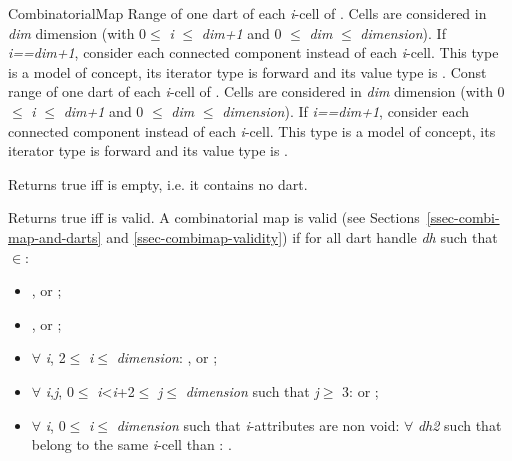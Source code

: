 \begin{ccRefConcept}{CombinatorialMap}
{Range of one dart of each \emph{i}-cell of .
  Cells are considered in \emph{dim} dimension  
  (with 0$\leq$ \emph{i} $\leq$ \emph{dim+1} and 0 $\leq$ \emph{dim} $\leq$ \emph{dimension}). If \emph{i==dim+1},  
  consider each connected component instead of each \emph{i}-cell. 
  This type is a model of  concept, its iterator type is forward and its value type is .}
\ccGlue
{}
{Const range of one dart of each \emph{i}-cell of .
  Cells are considered in \emph{dim} dimension 
  (with 0$\leq$ \emph{i} $\leq$ \emph{dim+1} and 0 $\leq$ \emph{dim} $\leq$ \emph{dimension}). If \emph{i==dim+1},  
  consider each connected component instead of each \emph{i}-cell. 
  This type is a model of  concept, its iterator type is forward and its value type is .}


 {Returns true iff  is empty,
  i.e. it contains no dart.}

         {Returns true iff  is valid.}
A combinatorial map  is valid (see Sections~\ref{ssec-combi-map-and-darts} and \ref{ssec-combimap-validity}) if for all dart handle \emph{dh} such that 
 $\in$:\\
\begin{itemize}
\item {}, or ;
\item {}, or ;
\item $\forall$ \emph{i}, 
2$\leq$ \emph{i}$\leq$ \emph{dimension}: 
  , or ;
\item $\forall$ \emph{i},\emph{j}, 0$\leq$ \emph{i}<\emph{i}+2$\leq$ \emph{j}$\leq$ \emph{dimension} such that \emph{j}$\geq$ 3:
   or
  ;
\item $\forall$  \emph{i}, 0$\leq$ \emph{i}$\leq$ \emph{dimension} such that \emph{i}-attributes are non void:
   $\forall$ \emph{dh2} such that  belong to the same \emph{i}-cell than :
   .
 \end{itemize}


\end{ccRefConcept}
